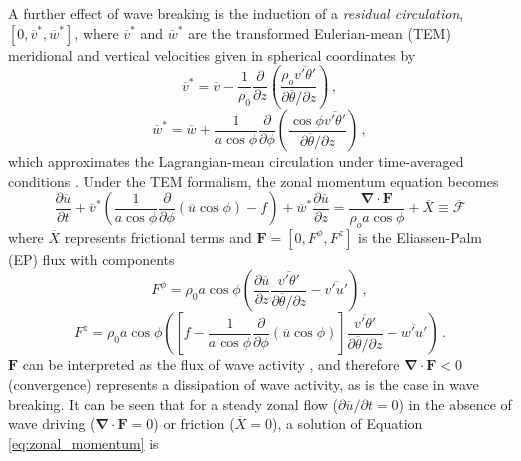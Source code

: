 A further effect of wave breaking is the induction of a \emph{residual
  circulation}, $[0, \overline{v}^*, \overline{w}^*]$, where $\overline{v}^*$ and
$\overline{w}^*$ are the transformed Eulerian-mean (TEM) meridional and vertical
velocities given in spherical coordinates by
\begin{equation}
  \overline{v}^* = \overline{v} - \frac{1}{\rho_0}\frac{\partial}{\partial z}
  \left(\frac{\rho_o\overline{v'\theta'}}{\partial\overline{\theta}/{\partial z}}\right) \, , 
\end{equation}
\begin{equation}
\overline{w}^* = \overline{w} + \frac{1}{a\cos\phi}\frac{\partial}{\partial\phi}
\left(\frac{\cos\phi\overline{v'\theta'}}{\partial\overline{\theta}/{\partial
      z}}\right) \, ,
\end{equation}
which approximates the Lagrangian-mean circulation under time-averaged
conditions \citep{Andrews1976,Dunkerton1978,Holton1990}. Under the TEM
formalism, the zonal momentum equation becomes
\begin{equation}
\frac{\partial\overline{u}}{\partial t} +
\overline{v}^*\left(\frac{1}{a\cos\phi}\frac{\partial}{\partial\phi}(\overline{u}\cos{\phi})
  - f \right) + \overline{w}^*\frac{\partial\overline{u}}{\partial z} =
\frac{\mathbf{\nabla \cdot F}}{\rho_oa\cos\phi} + \overline{X} \equiv \overline{\mathcal{F}}
\label{eq:zonal_momentum}
\end{equation}
where $\overline{X}$ represents frictional terms and $\mathbf{F}=[0,F^\phi,F^z]$
is the Eliassen-Palm (EP) flux with components
\begin{equation}
F^\phi = \rho_0a\cos\phi\left(\frac{\partial\overline{u}}{\partial
    z}\frac{\overline{v'\theta'}}{\partial\overline{\theta}/\partial z} -
  \overline{v'u'}\right) \, ,
\end{equation}
\begin{equation}
F^z =
\rho_0a\cos\phi\left(\left[f-\frac{1}{a\cos\phi}\frac{\partial}{\partial\phi}(\overline{u}\cos\phi)\right]\frac{\overline{v'\theta'}}{\partial\overline{\theta}/\partial
      z} - \overline{w'u'}\right) \, .
\end{equation}
$\mathbf{F}$ can be interpreted as the flux of wave activity
\citep{Andrews1987}, and therefore $\mathbf{\nabla\cdot F}<0$ (convergence)
represents a dissipation of wave activity, as is the case in wave breaking. It
can be seen that for a steady zonal flow ($\partial\overline{u}/\partial t = 0$)
in the absence of wave driving ($\mathbf{\nabla\cdot F} = 0$) or friction
($\overline{X} = 0$), a solution of Equation \ref{eq:zonal_momentum} is
